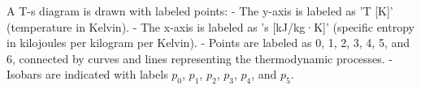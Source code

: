 A T-s diagram is drawn with labeled points:  
- The y-axis is labeled as 'T [K]' (temperature in Kelvin).  
- The x-axis is labeled as 's [kJ/kg·K]' (specific entropy in kilojoules per kilogram per Kelvin).  
- Points are labeled as 0, 1, 2, 3, 4, 5, and 6, connected by curves and lines representing the thermodynamic processes.  
- Isobars are indicated with labels \( p_0 \), \( p_1 \), \( p_2 \), \( p_3 \), \( p_4 \), and \( p_5 \).